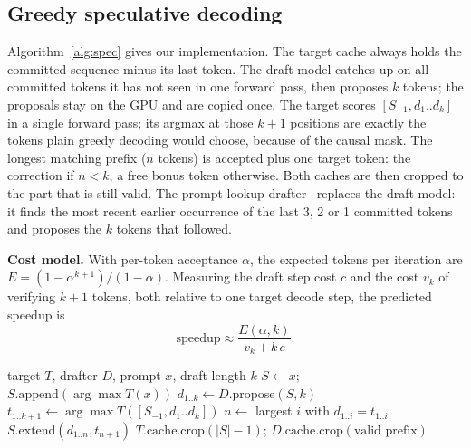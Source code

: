 \documentclass[conference]{IEEEtran}
\begin{document}
\subsection{Greedy speculative decoding}
Algorithm~\ref{alg:spec} gives our implementation. The target cache always holds the committed sequence minus its last token. The draft model catches up on all committed tokens it has not seen in one forward pass, then proposes $k$ tokens; the proposals stay on the GPU and are copied once. The target scores \([S_{-1}, d_1..d_k]\) in a single forward pass; its argmax at those $k+1$ positions are exactly the tokens plain greedy decoding would choose, because of the causal mask. The longest matching prefix ($n$ tokens) is accepted plus one target token: the correction if $n<k$, a free bonus token otherwise. Both caches are then cropped to the part that is still valid. The prompt-lookup drafter~\cite{saxena2023prompt} replaces the draft model: it finds the most recent earlier occurrence of the last 3, 2 or 1 committed tokens and proposes the $k$ tokens that followed.

\textbf{Cost model.} With per-token acceptance $\alpha$, the expected tokens per iteration are $E=(1-\alpha^{k+1})/(1-\alpha)$. Measuring the draft step cost $c$ and the cost $v_k$ of verifying $k+1$ tokens, both relative to one target decode step, the predicted speedup is
\begin{equation}
\text{speedup} \approx \frac{E(\alpha,k)}{v_k + k\,c}.
\label{eq:cost}
\end{equation}

\begin{algorithm}[t]
\caption{Greedy speculative decoding with cache rollback}
\label{alg:spec}
\footnotesize
\begin{algorithmic}[1]
\Require target $T$, drafter $D$, prompt $x$, draft length $k$
\State $S \gets x$;\; $S.\mathrm{append}(\arg\max T(x))$ 
  \State $d_{1..k} \gets D.\mathrm{propose}(S, k)$ 
  \State $t_{1..k+1} \gets \arg\max T([S_{-1}, d_1..d_k])$ 
  \State $n \gets$ largest $i$ with $d_{1..i}=t_{1..i}$
  \State $S.\mathrm{extend}(d_{1..n}, t_{n+1})$ 
  \State $T.\mathrm{cache.crop}(|S|-1)$;\; $D.\mathrm{cache.crop}(\text{valid prefix})$
\EndWhile
\end{algorithmic}
\end{algorithm}
\end{document}

